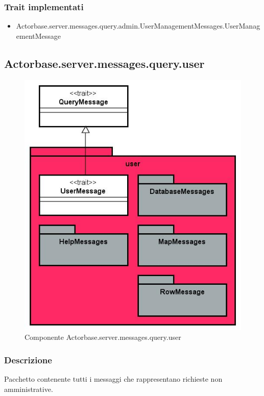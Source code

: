 \documentclass[a4paper]{article}
\begin{document}
			\subsubsection{Trait implementati}
				\begin{itemize}
					\item Actorbase.server.messages.query.admin.UserManagementMessages.UserManagementMessage
				\end{itemize}
				
				
				
				
			
		\subsection{Actorbase.server.messages.query.user}
		
			\begin{figure}[H]
				\centering
				\includegraphics[scale = 0.7]{ST/Server/userLevel.jpg}
				\caption{Componente Actorbase.server.messages.query.user}
			\end{figure}
			
			\subsubsection{Descrizione}
				Pacchetto contenente tutti i messaggi che rappresentano richieste non amministrative.
				
\end{document}
